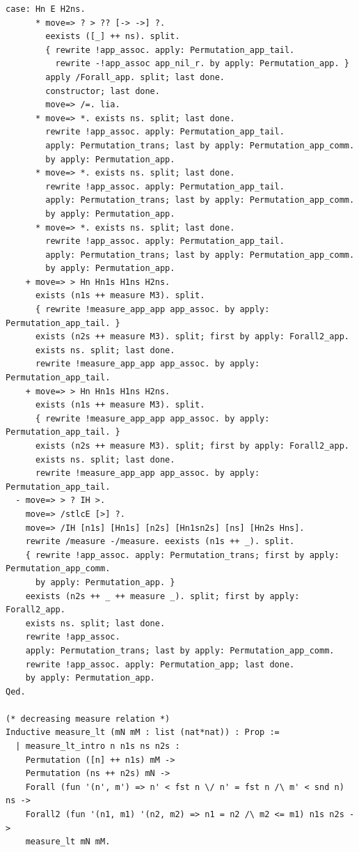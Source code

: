 \documentclass[10pt,a4paper]{article}
\begin{document}
\begin{lstlisting}[style=authorcoq]
      case: Hn E H2ns.
      * move=> ? > ?? [-> ->] ?.
        eexists ([_] ++ ns). split.
        { rewrite !app_assoc. apply: Permutation_app_tail.
          rewrite -!app_assoc app_nil_r. by apply: Permutation_app. }
        apply /Forall_app. split; last done.
        constructor; last done.
        move=> /=. lia.
      * move=> *. exists ns. split; last done.
        rewrite !app_assoc. apply: Permutation_app_tail.
        apply: Permutation_trans; last by apply: Permutation_app_comm.
        by apply: Permutation_app.
      * move=> *. exists ns. split; last done.
        rewrite !app_assoc. apply: Permutation_app_tail.
        apply: Permutation_trans; last by apply: Permutation_app_comm.
        by apply: Permutation_app.
      * move=> *. exists ns. split; last done.
        rewrite !app_assoc. apply: Permutation_app_tail.
        apply: Permutation_trans; last by apply: Permutation_app_comm.
        by apply: Permutation_app.
    + move=> > Hn Hn1s H1ns H2ns.
      exists (n1s ++ measure M3). split.
      { rewrite !measure_app_app app_assoc. by apply: Permutation_app_tail. }
      exists (n2s ++ measure M3). split; first by apply: Forall2_app.
      exists ns. split; last done.
      rewrite !measure_app_app app_assoc. by apply: Permutation_app_tail.
    + move=> > Hn Hn1s H1ns H2ns.
      exists (n1s ++ measure M3). split.
      { rewrite !measure_app_app app_assoc. by apply: Permutation_app_tail. }
      exists (n2s ++ measure M3). split; first by apply: Forall2_app.
      exists ns. split; last done.
      rewrite !measure_app_app app_assoc. by apply: Permutation_app_tail.
  - move=> > ? IH >.
    move=> /stlcE [>] ?.
    move=> /IH [n1s] [Hn1s] [n2s] [Hn1sn2s] [ns] [Hn2s Hns].
    rewrite /measure -/measure. eexists (n1s ++ _). split.
    { rewrite !app_assoc. apply: Permutation_trans; first by apply: Permutation_app_comm.
      by apply: Permutation_app. }
    eexists (n2s ++ _ ++ measure _). split; first by apply: Forall2_app.
    exists ns. split; last done.
    rewrite !app_assoc.
    apply: Permutation_trans; last by apply: Permutation_app_comm.
    rewrite !app_assoc. apply: Permutation_app; last done.
    by apply: Permutation_app.
Qed.

(* decreasing measure relation *)
Inductive measure_lt (mN mM : list (nat*nat)) : Prop :=
  | measure_lt_intro n n1s ns n2s :
    Permutation ([n] ++ n1s) mM ->
    Permutation (ns ++ n2s) mN ->
    Forall (fun '(n', m') => n' < fst n \/ n' = fst n /\ m' < snd n) ns ->
    Forall2 (fun '(n1, m1) '(n2, m2) => n1 = n2 /\ m2 <= m1) n1s n2s ->
    measure_lt mN mM.


\end{lstlisting}
\end{document}
